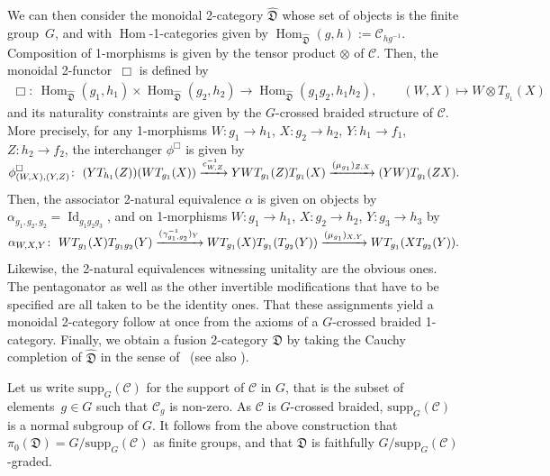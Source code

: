 \documentclass[10pt,a4paper]{amsart}
\numberwithin{equation}{section}
\begin{document}
\begin{Construction}
We can then consider the monoidal 2-category $\widehat{\mathfrak{D}}$ whose set of objects is the finite group~$G$, and with $\operatorname{Hom}$-1-categories given by $\operatorname{Hom}_{\widehat{\mathfrak{D}}}(g,h):=\mathcal{C}_{hg^{-1}}$.
 Composition of 1-morphisms is given by the tensor product $\otimes$ of $\mathcal{C}$. Then, the monoidal 2-functor~$\Box$ is defined by
 \begin{gather*}
\Box\colon\ \operatorname{Hom}_{\widehat{\mathfrak{D}}}(g_1,h_1)\times \operatorname{Hom}_{\widehat{\mathfrak{D}}}(g_2,h_2)\rightarrow \operatorname{Hom}_{\widehat{\mathfrak{D}}}(g_1g_2,h_1h_2),\qquad (W,X) \mapsto W\otimes T_{g_1}(X)
\end{gather*}
and its naturality constraints are given by the $G$-crossed braided structure of $\mathcal{C}$. More precisely, for any 1-morphisms $W\colon g_1\rightarrow h_1$, $X\colon g_2\rightarrow h_2$, $Y\colon h_1\rightarrow f_1$, $Z\colon h_2\rightarrow f_2$, the interchanger $\phi^{\Box}$ is given by
\begin{gather*}
\smash{\phi^{\Box}_{(W,X),(Y,Z)}\colon\ (YT_{h_1}(Z))(WT_{g_1}(X))\xrightarrow{c^{-1}_{W,Z}}YWT_{g_1}(Z)T_{g_1}(X)\xrightarrow{(\mu_{g_1})_{Z,X}}(YW)T_{g_1}(ZX)}.
\end{gather*}
Then, the associator 2-natural equivalence $\alpha$ is given on objects by $\alpha_{g_1,g_2,g_2}=\operatorname{Id}_{g_1g_2g_3}$, and on 1-morphisms $W\colon g_1\rightarrow h_1$, $X\colon g_2\rightarrow h_2$, $Y\colon g_3\rightarrow h_3$ by
\begin{gather*}
\smash{\alpha_{W,X,Y}\colon\ WT_{g_1}(X)T_{g_1g_2}(Y)\xrightarrow{(\gamma^{-1}_{g_1,g_2})_Y}WT_{g_1}(X)T_{g_1}(T_{g_2}(Y))\xrightarrow{(\mu_{g_1})_{X,Y}}WT_{g_1}(XT_{g_2}(Y))}.
\end{gather*}
Likewise, the 2-natural equivalences witnessing unitality are the obvious ones. The pentagonator as well as the other invertible modifications that have to be specified are all taken to be the identity ones. That these assignments yield a monoidal 2-category follow at once from the axioms of a $G$-crossed braided 1-category. Finally, we obtain a fusion 2-category $\mathfrak{D}$ by taking the Cauchy completion of $\widehat{\mathfrak{D}}$ in the sense of~\cite{GJF} (see also \cite{D1,DR}).
\end{Construction}

\begin{Remark}
Let us write $\mathrm{supp}_G(\mathcal{C})$ for the support of $\mathcal{C}$ in $G$, that is the subset of elements~${g\in G}$ such that $\mathcal{C}_g$ is non-zero. As $\mathcal{C}$ is $G$-crossed braided, $\mathrm{supp}_G(\mathcal{C})$ is a normal subgroup of $G$. It follows from the above construction that $\pi_0(\mathfrak{D})=G/\mathrm{supp}_G(\mathcal{C})$ as finite groups, and that $\mathfrak{D}$ is faithfully $G/\mathrm{supp}_G(\mathcal{C})$-graded.
\end{Remark}
\end{document}
